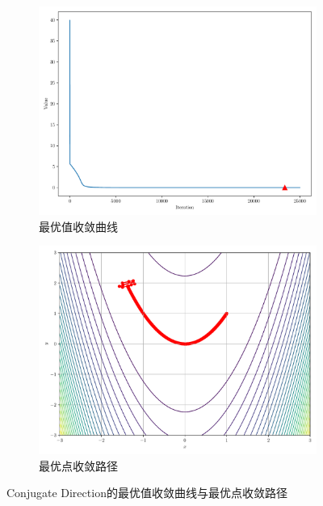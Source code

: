 \begin{figure}[!ht]
    \centering
    \begin{subfigure}{0.4\textwidth}
        \centering
        \includegraphics[width=\textwidth]{figures/Conjugate Direction_loss.pdf}
        \caption{最优值收敛曲线}
    \end{subfigure}
    \begin{subfigure}{0.4\textwidth}
        \centering
        \includegraphics[width=\textwidth]{figures/Conjugate Direction_points.pdf}
        \caption{最优点收敛路径}
    \end{subfigure}
    \caption{Conjugate Direction的最优值收敛曲线与最优点收敛路径}
\end{figure}
